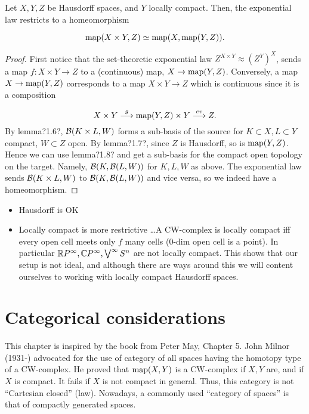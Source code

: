 \documentclass[main.tex]{subfiles}
\begin{document}
\begin{thm}
	Let \(X,Y,Z\) be Hausdorff spaces, and \(Y\) locally compact.
	Then, the exponential law restricts to a homeomorphism

\[
		\map(X \times Y, Z) \simeq \map(X, \map(Y,Z)).

\]
\end{thm}

\begin{proof}
	First notice that the set-theoretic exponential law \(Z^{X \times Y} \approx {(Z^Y)}^X \), sends a map \(f: X \times Y \to Z\) to a (continuous) map, \(X \to \operatorname{map}(Y,Z)\).
	Conversely, a map \(X \to \operatorname{map}(Y,Z)\) corresponds to a map \(X \times Y \to Z\) which is continuous since it is a composition

\[
		X \times Y \stackrel{g}{\longrightarrow} \map(Y, Z) \times Y \stackrel{ev}{\longrightarrow} Z.

\]
	By lemma?1.6?, \(\mathcal{B}(K \times L, W)\) forms a sub-basis of the source for \(K \subset X, L \subset Y\) compact, \(W \subset Z\) open.
	By lemma?1.7?, since \(Z\) is Hausdorff, so is \(\operatorname{map}(Y,Z)\).
	Hence we can use lemma?1.8? and get a sub-basis for the compact open topology on the target. Namely, \(\mathcal{B}(K,\mathcal{B}(L,W))\) for \(K,L,W\) as above.
	The exponential law sends \(\mathcal{B}(K \times L, W)\) to \(\mathcal{B}(K, \mathcal{B}(L,W))\) and vice versa, so we indeed have a homeomorphism.
\end{proof}

\begin{rem}

\begin{itemize}
		\item Hausdorff is OK
		\item Locally compact is more restrictive \ldots A CW-complex is locally compact iff every open cell meets only \(f\) many cells (0-dim open cell is a point).
		 In particular \(\mathbb{R} P^\infty, \mathbb{C} P^\infty, \bigvee^\infty S^n \) are not locally compact.
		 This shows that our setup is not ideal, and although there are ways around this we will content ourselves to working with locally compact Hausdorff spaces.

\end{itemize}
\end{rem}

\section{Categorical considerations}

This chapter is inspired by the book from Peter May, Chapter 5.
John Milnor (1931-) advocated for the use of category of all spaces having the homotopy type of a CW-complex.
He proved that \(\operatorname{map}(X,Y)\) is a CW-complex if \(X,Y\) are, and if \(X\) is compact.
It fails if \(X\) is not compact in general.
Thus, this category is not ``Cartesian closed'' (\exp law).
Nowadays, a commonly used ``category of spaces'' is that of compactly generated spaces.
\end{document}
